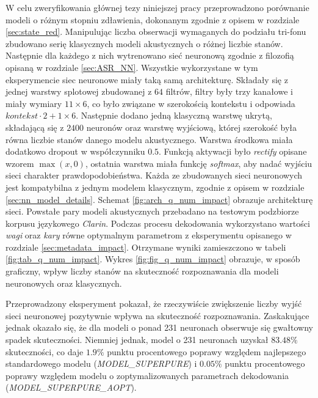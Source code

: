 \documentclass[11pt]{article}
\begin{document}
		W celu zweryfikowania głównej tezy niniejszej pracy przeprowadzono porównanie modeli o różnym stopniu zdławienia, dokonanym zgodnie z opisem w rozdziale \ref{sec:state_red}. Manipulując liczba obserwacji wymaganych do podziału tri-fonu zbudowano serię klasycznych modeli akustycznych o różnej liczbie stanów. Następnie dla każdego z nich wytrenowano sieć neuronową zgodnie z filozofią opisaną w rozdziale \ref{sec:ASR_NN}. Wszystkie wykorzystane w tym eksperymencie siec neuronowe miały taką samą architekturę. Składały się z jednej warstwy splotowej zbudowanej z $64$ filtrów, filtry były trzy kanałowe i miały wymiary $11\times6$, co było związane w szerokością kontekstu i odpowiada $kontekst \cdot 2 + 1\times6$. Następnie dodano jedną klasyczną warstwę ukrytą, składającą się z $2400$ neuronów oraz warstwę wyjściową, której szerokość była równa liczbie stanów danego modelu akustycznego. Warstwa środkowa miała dodatkowo dropout w współczynniku $0.5$. Funkcją aktywacji było \textit{rectify} opisane wzorem $\max(x,0)$, ostatnia warstwa miała funkcję \textit{softmax}, aby nadać wyjściu sieci charakter prawdopodobieństwa. Każda ze zbudowanych sieci neuronowych jest kompatybilna z jednym modelem klasycznym, zgodnie z opisem w rozdziale \ref{sec:nn_model_details}. Schemat \ref{fig:arch_q_num_impact} obrazuje architekturę sieci. Powstałe pary modeli akustycznych przebadano na testowym podzbiorze korpusu językowego \textit{Clarin}. Podczas procesu dekodowania wykorzystano wartości \textit{wagi} oraz \textit{kary} równe optymalnym parametrom z eksperymentu opisanego w rozdziale \ref{sec:metadata_impact}. Otrzymane wyniki zamieszczono w tabeli \ref{fig:tab_q_num_impact}. Wykres \ref{fig:fig_q_num_impact} obrazuje, w sposób graficzny, wpływ liczby stanów na skuteczność rozpoznawania dla modeli neuronowych oraz klasycznych.
		
		Przeprowadzony eksperyment pokazał, że rzeczywiście zwiększenie liczby wyjść sieci neuronowej pozytywnie wpływa na skuteczność rozpoznawania. Zaskakujące jednak okazało się, że dla modeli o ponad 231 neuronach obserwuje się gwałtowny spadek skuteczności. Niemniej jednak, model o 231 neuronach uzyskał  $83.48\%$ skuteczności, co daje $1.9\%$ punktu procentowego poprawy względem najlepszego standardowego modelu (\textit{MODEL\_SUPERPURE}) i $0.05\%$ punktu procentowego poprawy względem modelu o zoptymalizowanych parametrach dekodowania (\textit{MODEL\_SUPERPURE\_AOPT}). 
		
\end{document}
